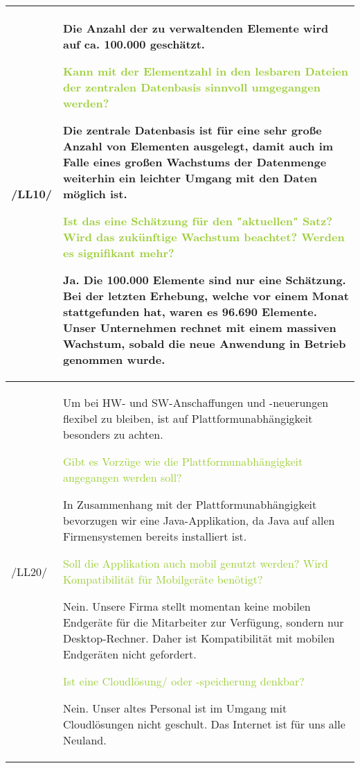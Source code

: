 \begin{center}
    \begin{tabular}[ht] {l | p{13cm}}
        \hline
        /LL10/ & Die Anzahl der zu verwaltenden Elemente wird auf ca. 100.000 geschätzt. 
        
        \textcolor{YellowGreen}{Kann mit der Elementzahl in den lesbaren Dateien der zentralen Datenbasis sinnvoll umgegangen werden?}

        \textcolor{NavyBlue}{Die zentrale Datenbasis ist für eine sehr große Anzahl von Elementen ausgelegt, damit auch im Falle eines großen Wachstums der Datenmenge weiterhin ein leichter Umgang mit den Daten möglich ist.}

        \textcolor{YellowGreen}{Ist das eine Schätzung für den "aktuellen" Satz? Wird das zukünftige Wachstum beachtet? Werden es signifikant mehr?}
        
        \textcolor{NavyBlue}{Ja. Die 100.000 Elemente sind nur eine Schätzung. Bei der letzten Erhebung, welche vor einem Monat stattgefunden hat, waren es 96.690 Elemente. Unser Unternehmen rechnet mit einem massiven Wachstum, sobald die neue Anwendung in Betrieb genommen wurde.}



        \\
        \hline
        /LL20/ & Um bei HW- und SW-Anschaffungen und -neuerungen flexibel zu bleiben, ist auf Plattformunabhängigkeit besonders zu achten. 
        
        \textcolor{YellowGreen}{Gibt es Vorzüge wie die Plattformunabhängigkeit angegangen werden soll?}

        \textcolor{NavyBlue}{In Zusammenhang mit der Plattformunabhängigkeit bevorzugen wir eine Java-Applikation, da Java auf allen Firmensystemen bereits installiert ist.}

        \textcolor{YellowGreen}{Soll die Applikation auch mobil genutzt werden? Wird Kompatibilität für Mobilgeräte benötigt?}

        \textcolor{NavyBlue}{Nein. Unsere Firma stellt momentan keine mobilen Endgeräte für die Mitarbeiter zur Verfügung, sondern nur Desktop-Rechner. Daher ist Kompatibilität mit mobilen Endgeräten nicht gefordert.}

        \textcolor{YellowGreen}{Ist eine Cloudlösung/ oder -speicherung denkbar?}

        \textcolor{NavyBlue}{Nein. Unser altes Personal ist im Umgang mit Cloudlösungen nicht geschult. Das Internet ist für uns alle Neuland.}

        \\
        \hline
    \end{tabular}
\end{center}

